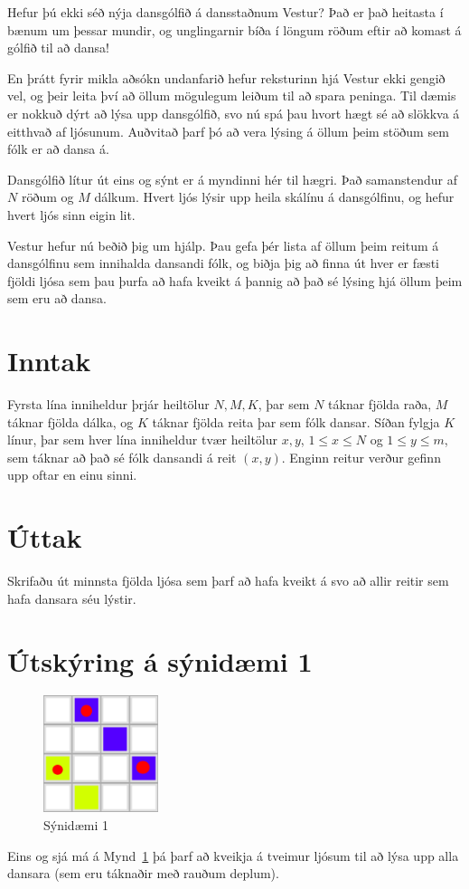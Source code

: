 

Hefur þú ekki séð nýja dansgólfið á dansstaðnum Vestur? Það er það heitasta í
bænum um þessar mundir, og unglingarnir bíða í löngum röðum eftir að komast á
gólfið til að dansa!

En þrátt fyrir mikla aðsókn undanfarið hefur reksturinn hjá Vestur ekki gengið
vel, og þeir leita því að öllum mögulegum leiðum til að spara peninga. Til
dæmis er nokkuð dýrt að lýsa upp dansgólfið, svo nú spá þau hvort hægt sé að
slökkva á eitthvað af ljósunum. Auðvitað þarf þó að vera lýsing á öllum þeim
stöðum sem fólk er að dansa á.

Dansgólfið lítur út eins og sýnt er á myndinni hér til hægri. Það samanstendur
af $N$ röðum og $M$ dálkum. Hvert ljós lýsir upp heila skálínu á dansgólfinu,
og hefur hvert ljós sinn eigin lit.

Vestur hefur nú beðið þig um hjálp. Þau gefa þér lista af öllum þeim reitum á
dansgólfinu sem innihalda dansandi fólk, og biðja þig að finna út hver er
fæsti fjöldi ljósa sem þau þurfa að hafa kveikt á þannig að það sé lýsing hjá
öllum þeim sem eru að dansa.

\section*{Inntak}
Fyrsta lína inniheldur þrjár heiltölur $N, M, K$, þar sem $N$ táknar fjölda
raða, $M$ táknar fjölda dálka, og $K$ táknar fjölda reita þar sem fólk dansar.
Síðan fylgja $K$ línur, þar sem hver lína inniheldur tvær heiltölur $x, y$, $1
\leq x \leq N$ og $1 \leq y \leq m$, sem táknar að það sé fólk dansandi á reit
$(x,y)$. Enginn reitur verður gefinn upp oftar en einu sinni.

\section*{Úttak}
Skrifaðu út minnsta fjölda ljósa sem þarf að hafa kveikt á svo að allir reitir
sem hafa dansara séu lýstir.

\section*{Útskýring á sýnidæmi 1}
\begin{figure}[h]
    \centering
    \includegraphics[width=0.3\textwidth]{dansgolf_sample1}
    \caption{Sýnidæmi 1}
    \label{fig:sample1}
\end{figure}
Eins og sjá má á Mynd~\ref{fig:sample1} þá þarf að kveikja á tveimur ljósum til að
lýsa upp alla dansara (sem eru táknaðir með rauðum deplum).

